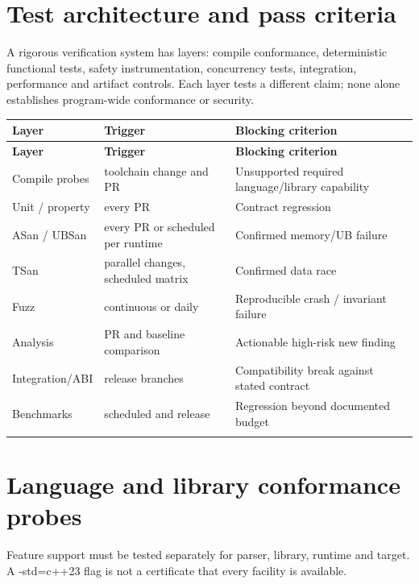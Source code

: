 \documentclass[11pt]{article}
\begin{document}
\docfront
\section{Test architecture and pass criteria}
A rigorous verification system has layers: compile conformance, deterministic functional tests, safety instrumentation, concurrency tests, integration, performance and artifact controls. Each layer tests a different claim; none alone establishes program-wide conformance or security.

\small
\begin{longtable}{@{}p{.18\linewidth}p{.40\linewidth}p{.34\linewidth}@{}}
\toprule
\textbf{Layer} & \textbf{Trigger} & \textbf{Blocking criterion}\\
\midrule
\endfirsthead
\toprule
\textbf{Layer} & \textbf{Trigger} & \textbf{Blocking criterion}\\
\midrule
\endhead
Compile probes & toolchain change and PR & Unsupported required language/library capability\\
\addlinespace[2pt]
Unit / property & every PR & Contract regression\\
\addlinespace[2pt]
ASan / UBSan & every PR or scheduled per runtime & Confirmed memory/UB failure\\
\addlinespace[2pt]
TSan & parallel changes, scheduled matrix & Confirmed data race\\
\addlinespace[2pt]
Fuzz & continuous or daily & Reproducible crash / invariant failure\\
\addlinespace[2pt]
Analysis & PR and baseline comparison & Actionable high-risk new finding\\
\addlinespace[2pt]
Integration/ABI & release branches & Compatibility break against stated contract\\
\addlinespace[2pt]
Benchmarks & scheduled and release & Regression beyond documented budget\\
\addlinespace[2pt]
\bottomrule
\end{longtable}
\normalsize
\section{Language and library conformance probes}
Feature support must be tested separately for parser, library, runtime and target. A -std=c++23 flag is not a certificate that every facility is available.
\end{document}

